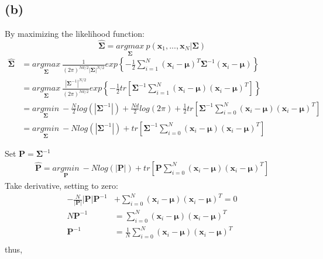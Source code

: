 \documentclass[11pt]{article}
\begin{document}
\subsection*{(b)}
By maximizing the likelihood function:
$$\hat{\pmb{\Sigma}} = \underset{\pmb{\Sigma}}{argmax}\ p(\pmb{x}_1,...,\pmb{x}_N|\pmb{\Sigma})$$
\begin{equation}
\begin{split}
\hat{\pmb{\Sigma}}&=\underset{\pmb{\Sigma}}{argmax}\ \frac{1}{(2\pi)^{Nd/2}|\pmb{\Sigma}|^{N/2}}exp\left\{-\frac{1}{2}\sum_{i=1}^{N}(\pmb{x}_i-\pmb{\mu})^T\pmb{\Sigma}^{-1}(\pmb{x}_i-\pmb{\mu})\right\}\\
&=\underset{\pmb{\Sigma}}{argmax}\  \frac{|\pmb{\Sigma}^{-1}|^{N/2}}{(2\pi)^{Nd/2}}exp\left\{-\frac{1}{2}tr\left[\pmb{\Sigma}^{-1}\sum_{i=1}^{N}(\pmb{x}_i-\pmb{\mu})(\pmb{x}_i-\pmb{\mu})^T\right]\right\}\\
&=\underset{\pmb{\Sigma}}{argmin}\ -\frac{N}{2}log(|\pmb{\Sigma}^{-1}|)+\frac{Nd}{2}log(2\pi)+\frac{1}{2}tr\left[\pmb{\Sigma}^{-1}\sum_{i=0}^{N}(\pmb{x}_i-\pmb{\mu})(\pmb{x}_i-\pmb{\mu})^T\right]\\
&=\underset{\pmb{\Sigma}}{argmin}\ -Nlog(|\pmb{\Sigma}^{-1}|)+tr\left[\pmb{\Sigma}^{-1}\sum_{i=0}^{N}(\pmb{x}_i-\pmb{\mu})(\pmb{x}_i-\pmb{\mu})^T\right]
\end{split}
\end{equation}
\pagebreak

\noindent Set $\pmb{P} = \pmb{\Sigma}^{-1}$\\
\begin{equation}
\begin{split}
\hat{\pmb{P}} = \underset{\pmb{P}}{argmin}\ -Nlog(|\pmb{P}|)+tr\left[\pmb{P}\sum_{i=0}^{N}(\pmb{x}_i-\pmb{\mu})(\pmb{x}_i-\pmb{\mu})^T\right]
\end{split}
\end{equation}
Take derivative, setting to zero:
\begin{equation}
\begin{split}
-\frac{N}{|\pmb{P}|}|\pmb{P}|\pmb{P}^{-1}&+\sum_{i=0}^{N}(\pmb{x}_i-\pmb{\mu})(\pmb{x}_i-\pmb{\mu})^T = 0\\
N\pmb{P}^{-1}&=\sum_{i=0}^{N}(\pmb{x}_i-\pmb{\mu})(\pmb{x}_i-\pmb{\mu})^T\\
\pmb{P}^{-1}&=\frac{1}{N}\sum_{i=0}^{N}(\pmb{x}_i-\pmb{\mu})(\pmb{x}_i-\pmb{\mu})^T\\
\end{split}
\end{equation}
thus,
\end{document}
